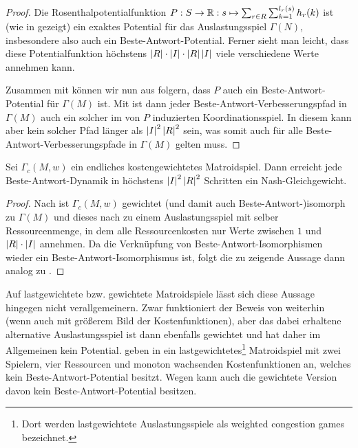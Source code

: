 \begin{proof}
	Die Rosenthalpotentialfunktion $P: S \to \mathbb{R}: s \mapsto \sum_{r \in R}\sum_{k=1}^{l_r(s)} h_r(k)$ ist (wie in  gezeigt) ein exaktes Potential für das Auslastungsspiel $\Gamma(N)$, insbesondere also auch ein Beste-Antwort-Potential. Ferner sieht man leicht, dass diese Potentialfunktion höchstens $\left|R\right|\cdot\left|I\right|\cdot \left|R\right|\left|I\right|$ viele verschiedene Werte annehmen kann.
	
	Zusammen mit  können wir nun aus  folgern, dass $P$ auch ein Beste-Antwort-Potential für $\Gamma(M)$ ist. Mit  ist dann jeder Beste-Antwort-Verbesserungspfad in $\Gamma(M)$ auch ein solcher im von $P$ induzierten Koordinationsspiel. In diesem kann aber kein solcher Pfad länger als $\left|I\right|^2\left|R\right|^2$ sein, was somit auch für alle Beste-Antwort-Verbesserungspfade in $\Gamma(M)$ gelten muss.
\end{proof}

\begin{kor}
	Sei $\Gamma_c(M,w)$ ein endliches kostengewichtetes Matroidspiel. Dann erreicht jede Beste-Antwort-Dynamik in höchstens $\left|I\right|^2\left|R\right|^2$ Schritten ein Nash-Gleichgewicht.
\end{kor}

\begin{proof}
	Nach  ist $\Gamma_c(M,w)$ gewichtet (und damit auch Beste-Antwort-)isomorph zu $\Gamma(M)$ und dieses nach  zu einem Auslastungsspiel mit selber Ressourcenmenge, in dem alle Ressourcenkosten nur Werte zwischen $1$ und $\left|R\right|\cdot\left|I\right|$ annehmen. Da die Verknüpfung von Beste-Antwort-Isomorphismen wieder ein Beste-Antwort-Isomorphismus ist, folgt die zu zeigende Aussage dann analog zu . 
\end{proof}

Auf lastgewichtete bzw. gewichtete Matroidspiele lässt sich diese Aussage hingegen nicht verallgemeinern. Zwar funktioniert der Beweis von  weiterhin (wenn auch mit größerem Bild der Kostenfunktionen), aber das dabei erhaltene alternative Auslastungsspiel ist dann ebenfalls gewichtet und hat daher im Allgemeinen kein Potential. \citeauthor{NGinGewMatroidSpielen} geben in \cite[Theorem 14]{NGinGewMatroidSpielen} ein lastgewichtetes\footnote{Dort werden lastgewichtete Auslastungsspiele als \glqq weighted congestion games\grqq{} bezeichnet.} Matroidspiel mit zwei Spielern, vier Ressourcen und monoton wachsenden Kostenfunktionen an, welches kein Beste-Antwort-Potential besitzt. Wegen  kann auch die gewichtete Version davon kein Beste-Antwort-Potential besitzen.


